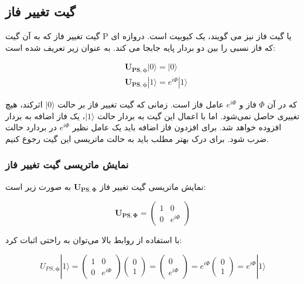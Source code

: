 \documentclass{book}
\begin{document}
\subsection*{گیت تغییر فاز}
گیت تغییر فاز که به آن گیت P یا گیت فاز نیز می گویند، یک کیوبیت است.
دروازه ای که فاز نسبی را بین دو بردار پایه جابجا می کند. به عنوان زیر تعریف شده است:
\begin{center}
	$$\begin{aligned}
		& \boldsymbol{U}_{\boldsymbol{PS}, \boldsymbol{\phi}}|0\rangle=|0\rangle \\
		& \boldsymbol{U}_{\boldsymbol{PS},  \boldsymbol{\phi}}|1\rangle=e^{i \Phi}|1\rangle
	\end{aligned}$$
\end{center}


که در آن $\Phi$ فاز و $e^{i\Phi}$ عامل فاز است. 
زمانی که گیت تغییر فاز بر حالت $\vert 0 \rangle$  اثرکند، هیچ تغییری حاصل نمی‌شود. اما با اعمال این گیت به بردار حالت $\vert 1 \rangle$، یک فاز اضافه به بردار افزوده خواهد شد. برای افزدون فاز اضافه  باید یک عامل نظیر  $e^{i\Phi}$ در بردارد حالت ضرب شود. برای درک بهتر مطلب باید به حالت ماتریسی این گیت رجوع کنیم.





\subsubsection{نمایش ماتریسی گیت تغییر فاز}

نمایش ماتریسی گیت تغییر فاز $\boldsymbol{U}_{\boldsymbol{P} \boldsymbol{S}, \boldsymbol{\Phi}}$ به صورت زیر است:

\begin{center}
	$$\boldsymbol{U}_{\boldsymbol{P} \boldsymbol{S}, \boldsymbol{\Phi}}=\left(\begin{array}{cc}
		1 & 0 \\
		0 & e^{i \Phi}
	\end{array}\right)$$
\end{center}
با استفاده از روابط بالا می‌توان  به راحتی اثبات کرد: 
\begin{center}
	$$U_{P S, \boldsymbol{\phi}}|1\rangle=\left(\begin{array}{cc}
		1 & 0 \\
		0 & e^{i \Phi}
	\end{array}\right)\left(\begin{array}{l}
		0 \\
		1
	\end{array}\right)=\left(\begin{array}{c}
		0 \\
		e^{i \Phi}
	\end{array}\right)=e^{i \Phi}\left(\begin{array}{l}
		0 \\
		1
	\end{array}\right)=e^{i \Phi}|1\rangle$$
\end{center}
\end{document}

